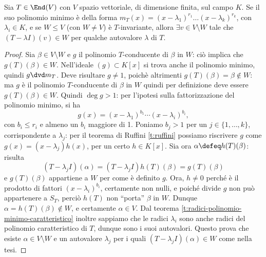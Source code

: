 \begin{lemma} \label{l:conducente}
	Sia $T\in \End(V)$ con $V$ spazio vettoriale, di dimensione finita, sul campo $K$.
	Se il suo polinomio minimo è della forma $m_T(x) = (x-\lambda_1)^{r_1}\dots(x-\lambda_k)^{r_k}$, con $\lambda_i\in K$, e se $W\le V$ (con $W\ne V$) è $T$-invariante, allora $\exists v\in V\setminus W$ tale che $(T-\lambda I)(v)\in W$ per qualche autovalore $\lambda$ di $T$.
\end{lemma}
\begin{proof}
	Sia $\beta\in V\setminus W$ e $g$ il polinomio $T$-conducente di $\beta$ in $W$: ciò implica che $g(T)(\beta)\in W$.
	Nell'ideale $(g)\subset K[x]$ si trova anche il polinomio minimo, quindi $g\dvd m_T$.
	Deve risultare $g\ne 1$, poichè altrimenti $g(T)(\beta) = \beta\notin W$: ma $g$ è il polinomio $T$-conducente di $\beta$ in $W$ quindi per definizione deve essere $g(T)(\beta)\in W$.
	Quindi $\deg g>1$: per l'ipotesi sulla fattorizzazione del polinomio minimo, si ha
	\begin{equation*}
		g(x) = (x-\lambda_1)^{b_1}\cdots (x-\lambda_i)^{b_i},
	\end{equation*}
	con $b_i\le r_i$ e almeno un $b_i$ maggiore di 1.
	Poniamo $b_j > 1$ per un $j\in\{1,\dots,k\}$, corrispondente a $\lambda_j$: per il teorema di Ruffini \ref{t:ruffini} possiamo riscrivere $g$ come $g(x) = (x-\lambda_j)h(x)$, per un certo $h\in K[x]$.
	Sia ora $\alpha\defeq h(T)(\beta)$: risulta
	\begin{equation*}
		(T-\lambda_j I)(\alpha)=(T-\lambda_j I)h(T)(\beta)=g(T)(\beta)
	\end{equation*}
	e $g(T)(\beta)$ appartiene a $W$ per come è definito $g$.
	Ora, $h\ne 0$ perch\'e è il prodotto di fattori $(x-\lambda_i)^{b_i}$, certamente non nulli, e poich\'e divide $g$ non può appartenere a $S_T$, perciò $h(T)$ non ``porta'' $\beta$ in $W$.
	Dunque $\alpha=h(T)(\beta)\notin W$, e certamente $\alpha\in V$.
	Dal teorema \ref{t:radici-polinomio-minimo-caratteristico} inoltre sappiamo che le radici $\lambda_i$ sono anche radici del polinomio caratteristico di $T$, dunque sono i suoi autovalori.
	Questo prova che esiste $\alpha\in V\setminus W$ e un autovalore $\lambda_j$ per i quali $(T-\lambda_j I)(\alpha)\in W$ come nella tesi.
\end{proof}

